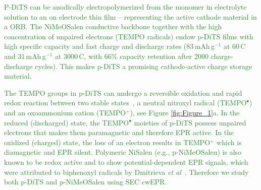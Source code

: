 \documentclass{WileyMSP-template}
\newcommand{\np}[1]{\textcolor{ForestGreen}{#1}}
\newcommand{\ik}[1]{\textcolor{RawSienna}{#1}}
\begin{document}
\bigbreak

\np{P-DiTS can be anodically electropolymerized from the monomer in electrolyte solution to an on electrode thin film -- representing the active cathode material in a ORB. The NiMeOSalen conductive backbone together with the high concentration of unpaired electrons (TEMPO radicals) endow p-DiTS films with high specific capacity and fast charge and discharge rates (83$\,$mAh$\,$g$^{-1}$ at 60$\,$C and 31$\,$mAh$\,$g$^{-1}$ at 3000$\,$C, with 66\% capacity retention after 2000 charge-discharge cycles)\cite{vereshchagin2020_battandsupercaps}. This makes p-DiTS a promising cathode-active charge storage material.}

\bigbreak

\np{The TEMPO groups in p-DiTS can undergo a reversible oxidation and rapid redox reaction between two stable states~\cite{vereshchagin2020_battandsupercaps}, a neutral nitroxyl radical (TEMPO$^{\bullet}$) and an oxoammonium cation (TEMPO$^{+}$), see Figure \ref{fig:Figure_1}a. In the reduced (discharged) state, the TEMPO$^{\bullet}$ moieties of p-DiTS possess unpaired electrons that makes them paramagnetic and therefore EPR active. In the oxidized (charged) state, the loss of an electron results in TEMPO$^{+}$ which is diamagnetic and EPR silent. Polymeric NiSalen (e.g., p-NiMeOSalen) is also known to be redox active and to show potential-dependent EPR signals, which were attributed to biphenoxyl radicals by Dmitrieva \textit{et al}~\cite{Dmitrieva2018}. Therefore we study both p-DiTS and p-NiMeOSalen using SEC cwEPR.
}


\end{document}
